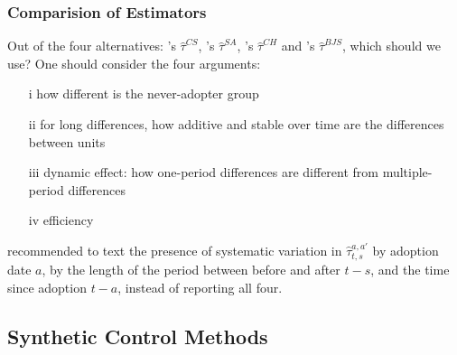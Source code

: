 \documentclass[twoside]{article}
\begin{document}
\subsubsection{Comparision of Estimators}
Out of the four alternatives: \citet{callaway2021difference}'s $\hat{\tau}^{CS}$, \citet{sun2021estimating}'s $\hat{\tau}^{SA}$, \citet{de2020two}'s $\hat{\tau}^{CH}$ and \citet{borusyak2024revisiting}'s $\hat{\tau}^{BJS}$, which should we use?
One should consider the four arguments:
\begin{itemize}
    \item[i] how different is the never-adopter group 
    \item[ii] for long differences, how additive and stable over time are the differences between units
    \item[iii] dynamic effect: how one-period differences are different from multiple-period differences 
    \item[iv] efficiency 
\end{itemize}
\citet{arkhangelsky2023causal} recommended to text the presence of systematic variation in $\hat{\tau}^{a,a'}_{t,s}$ by adoption date $a$, by the length of the period between before and after $t-s$, and the time since adoption $t-a$, instead of reporting all four.

\subsection{Synthetic Control Methods}
\end{document}
